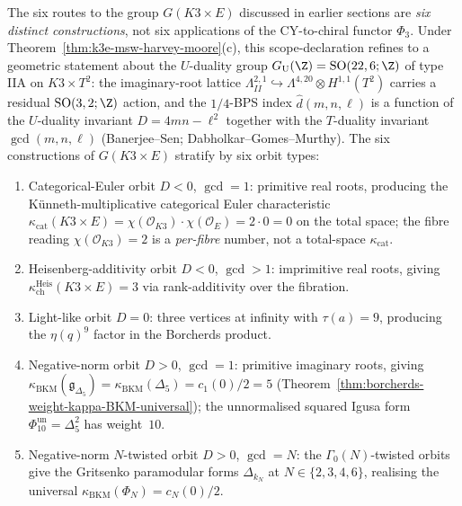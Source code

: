 \begin{remark}
\label{rem:k3e-six-u-duality-orbits}
%
The six routes to the group $G(K3\times E)$ discussed in earlier sections are \emph{six distinct constructions}, not six applications of the CY-to-chiral functor $\Phi_3$. Under Theorem~\ref{thm:k3e-msw-harvey-moore}(c), this scope-declaration refines to a geometric statement about the $U$-duality group $G_{\mathrm{U}}(\Z) = \mathrm{SO}(22, 6; \Z)$ of type IIA on $K3\times T^{2}$: the imaginary-root lattice $\Lambda^{2,1}_{II} \hookrightarrow \Lambda^{4,20} \otimes H^{1,1}(T^{2})$ carries a residual $\mathrm{SO}(3, 2; \Z)$ action, and the $1/4$-BPS index $\widehat{d}(m, n, \ell)$ is a function of the $U$-duality invariant $D = 4mn - \ell^{2}$ together with the $T$-duality invariant $\gcd(m, n, \ell)$ (Banerjee--Sen; Dabholkar--Gomes--Murthy). The six constructions of $G(K3\times E)$ stratify by six orbit types:
\begin{enumerate}[label=\textup{(\Roman*)}]
\item \textup{Categorical-Euler orbit $D < 0$, $\gcd = 1$:} primitive real roots, producing the K\"unneth-multiplicative categorical Euler characteristic $\kappa_{\mathrm{cat}}(K3 \times E) = \chi(\mathcal{O}_{K3}) \cdot \chi(\mathcal{O}_E) = 2 \cdot 0 = 0$ on the total space; the fibre reading $\chi(\mathcal{O}_{K3}) = 2$ is a \emph{per-fibre} number, not a total-space $\kappa_{\mathrm{cat}}$.
\item \textup{Heisenberg-additivity orbit $D < 0$, $\gcd > 1$:} imprimitive real roots, giving $\kappa_{\mathrm{ch}}^{\mathrm{Heis}}(K3\times E) = 3$ via rank-additivity over the fibration.
\item \textup{Light-like orbit $D = 0$:} three vertices at infinity with $\tau(a) = 9$, producing the $\eta(q)^{9}$ factor in the Borcherds product.
\item \textup{Negative-norm orbit $D > 0$, $\gcd = 1$:} primitive imaginary roots, giving $\kappa_{\mathrm{BKM}}(\mathfrak g_{\Delta_5})=\kappa_{\mathrm{BKM}}(\Delta_5)=c_{1}(0)/2 = 5$ (Theorem~\ref{thm:borcherds-weight-kappa-BKM-universal}); the unnormalised squared Igusa form \(\Phi_{10}^{\mathrm{un}}=\Delta_5^2\) has weight~$10$.
\item \textup{Negative-norm $N$-twisted orbit $D > 0$, $\gcd = N$:} the $\Gamma_0(N)$-twisted orbits give the Gritsenko paramodular forms $\Delta_{k_N}$ at $N\in\{2, 3, 4, 6\}$, realising the universal $\kappa_{\mathrm{BKM}}(\Phi_{N}) = c_{N}(0)/2$.

\end{enumerate}
\end{remark}
